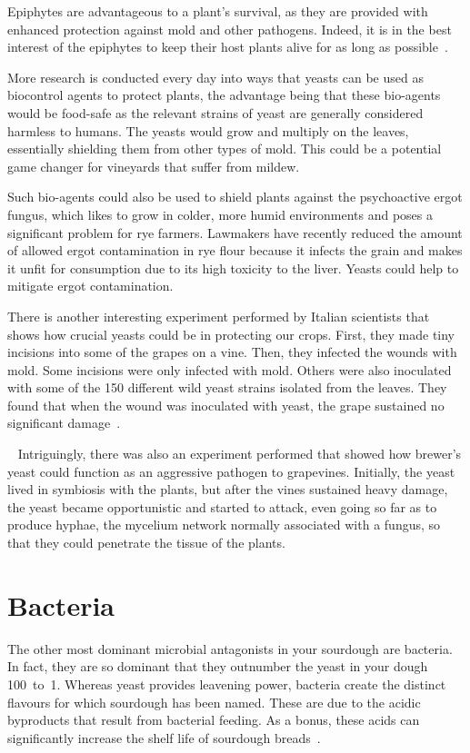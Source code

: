 Epiphytes are advantageous to a plant's survival, as they are provided with
enhanced protection against mold and other pathogens. Indeed, it is in the
best interest of the epiphytes to keep their host plants alive for as long as
possible~\cite{leaf+surface+sugars+epiphytes}.

More research is conducted every day into ways that yeasts can be used as
biocontrol agents to protect plants, the advantage being that these bio-agents
would be food-safe as the relevant strains of yeast are generally considered
harmless to humans. The yeasts would grow and multiply on the leaves,
essentially shielding them from other types of mold. This could be a potential
game changer for vineyards that suffer from mildew.

Such bio-agents could also be used to shield plants against the psychoactive
ergot fungus, which likes to grow in colder, more humid environments and
poses a significant problem for rye farmers.
Lawmakers have recently reduced the amount of allowed ergot contamination in
rye flour because it infects the grain and makes it unfit for consumption due
to its high toxicity to the liver. Yeasts could help to mitigate ergot contamination.

There is another interesting experiment performed by Italian scientists that
shows how crucial yeasts could be in protecting our crops. First, they made
tiny incisions into some of the grapes on a vine. Then, they infected the
wounds with mold. Some incisions were only infected with mold. Others were also
inoculated with some of the 150 different wild yeast strains isolated from the
leaves. They found that when the wound was inoculated with yeast, the grape
sustained no significant damage~\cite{yeasts+biocontrol+agent}.

~\label{sec:aggressive-yeast}%
Intriguingly, there was also an experiment performed that showed how brewer's
yeast could function as an aggressive pathogen to grapevines. Initially, the
yeast lived in symbiosis with the plants, but after the vines sustained heavy
damage, the yeast became opportunistic and started to attack, even going so far
as to produce hyphae, the mycelium network normally associated with a fungus,
so that they could penetrate the tissue of the plants.

\section{Bacteria}

The other most dominant microbial antagonists in your sourdough are bacteria.
In fact, they are so dominant that they outnumber the yeast in your dough
100~to~1. Whereas yeast provides leavening power, bacteria create the distinct
flavours for which sourdough has been named. These are due to the acidic
byproducts that result from bacterial feeding. As a bonus, these acids
can significantly increase the shelf life of sourdough
breads~\cite{shelflife+acidity}.

